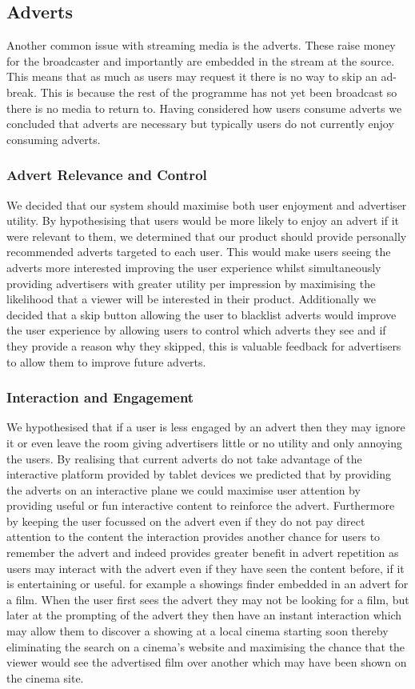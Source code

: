 \subsection{Adverts}
Another common issue with streaming media is the adverts. These raise money for the broadcaster and importantly are embedded in the stream at the source. This means that as much as users may request it there is no way to skip an ad-break. This is because the rest of the programme has not yet been broadcast so there is no media to return to. Having considered how users consume adverts we concluded that adverts are necessary but typically users do not currently enjoy consuming adverts.

\subsubsection{Advert Relevance and Control}
We decided that our system should maximise both user enjoyment and advertiser utility. By hypothesising that users would be more likely to enjoy an advert if it were relevant to them, we determined that our product should provide personally recommended adverts targeted to each user. This would make users seeing the adverts more interested improving the user experience whilst simultaneously providing advertisers with greater utility per impression by maximising the likelihood that a viewer will be interested in their product. Additionally we decided that a skip button allowing the user to blacklist adverts would improve the user experience by allowing users to control which adverts they see and if they provide a reason why they skipped, this is valuable feedback for advertisers to allow them to improve future adverts.

\subsubsection{Interaction and Engagement}
We hypothesised that if a user is less engaged by an advert then they may ignore it or even leave the room giving advertisers little or no utility and only annoying the users. By realising that current adverts do not take advantage of the interactive platform provided by tablet devices we predicted that by providing the adverts on an interactive plane we could maximise user attention by providing useful or fun interactive content to reinforce the advert. Furthermore by keeping the user focussed on the advert even if they do not pay direct attention to the content the interaction provides another chance for users to remember the advert and indeed provides greater benefit in advert repetition as users may interact with the advert even if they have seen the content before, if it is entertaining or useful. for example a showings finder embedded in an advert for a film. When the user first sees the advert they may not be looking for a film, but later at the prompting of the advert they then have an instant interaction which may allow them to discover a showing at a local cinema starting soon thereby eliminating the search on a cinema's website and maximising the chance that the viewer would see the advertised film over another which may have been shown on the cinema site.

